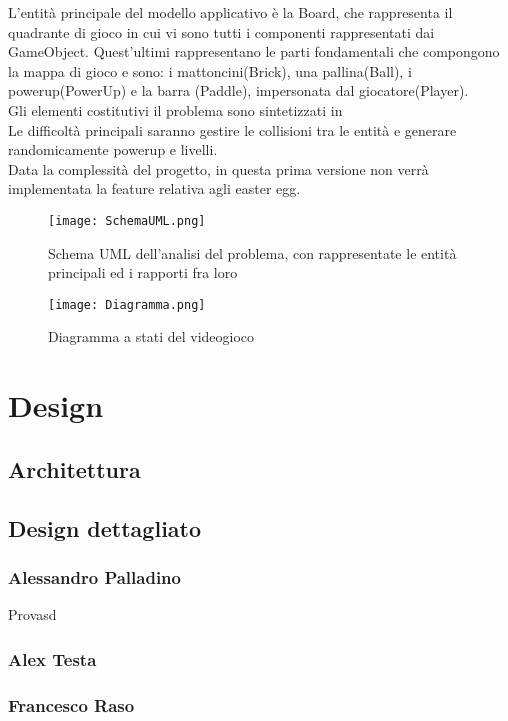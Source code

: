 \documentclass[a4paper,12pt]{report}
\begin{document}
L'entità principale del modello applicativo è la Board, che rappresenta il quadrante di gioco in cui vi sono tutti i componenti rappresentati dai GameObject. Quest'ultimi rappresentano le parti fondamentali che compongono la mappa di gioco e sono: i mattoncini(Brick), una pallina(Ball), i powerup(PowerUp) e la barra (Paddle), impersonata dal giocatore(Player).
\\
Gli elementi costitutivi il problema sono sintetizzati in %
\\
Le difficoltà principali saranno gestire le collisioni tra le entità e generare randomicamente powerup e livelli.
\\
Data la complessità del progetto, in questa prima versione non verrà implementata la feature relativa agli easter egg.


\begin{figure}[h]
\centering{}
 \texttt{[image: SchemaUML.png]}
\caption{Schema UML dell'analisi del problema, con rappresentate le entità principali ed i rapporti fra loro}
\label{SchemaUML}

\texttt{[image: Diagramma.png]}
\caption{Diagramma a stati del videogioco}
\label{Diagramma}

\end{figure}

\chapter{Design}
\section{Architettura}
\section{Design dettagliato}
    \subsection*{Alessandro Palladino}
    
    Provasd
    \subsection*{Alex Testa}
    
    
    \subsection*{Francesco Raso}
    
\end{document}
